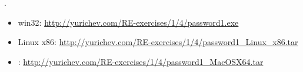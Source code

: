 .

\begin{itemize}
\item win32: \url{http://yurichev.com/RE-exercises/1/4/password1.exe}
\item Linux x86: \url{http://yurichev.com/RE-exercises/1/4/password1_Linux_x86.tar}
\item \MacOSX: \url{http://yurichev.com/RE-exercises/1/4/password1_MacOSX64.tar}
\end{itemize}

